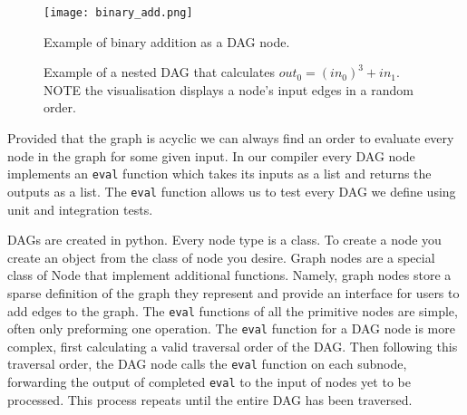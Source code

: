 \begin{figure}[h!]
    \begin{center}
        \texttt{[image: binary\_add.png]}
        \caption{Example of binary addition as a DAG node.}
        \label{fig:bin_add}
    \end{center}
\end{figure}

\begin{figure}[h!]
    \centering
    \hspace{1em}
    \caption{Example of a nested DAG that calculates $out_0 = (in_0)^3 + in_1$. NOTE the visualisation displays a node's input edges in a random order.}\label{fig:bn}
\end{figure}

Provided that the graph is acyclic we can always find an order to evaluate every node in the graph for some given input.
In our compiler every DAG node implements an \texttt{eval} function which takes its inputs as a list and returns the outputs as a list.
The \texttt{eval} function allows us to test every DAG we define using unit and integration tests.

DAGs are created in python.
Every node type is a class.
To create a node you create an object from the class of node you desire.
Graph nodes are a special class of Node that implement additional functions.
Namely, graph nodes store a sparse definition of the graph they represent and provide an interface for users to add edges to the graph.
The \texttt{eval} functions of all the primitive nodes are simple, often only preforming one operation.
The \texttt{eval} function for a DAG node is more complex, first calculating a valid traversal order of the DAG.
Then following this traversal order, the DAG node calls the \texttt{eval} function on each subnode, forwarding the output of completed \texttt{eval} to the input of nodes yet to be processed.
This process repeats until the entire DAG has been traversed.

